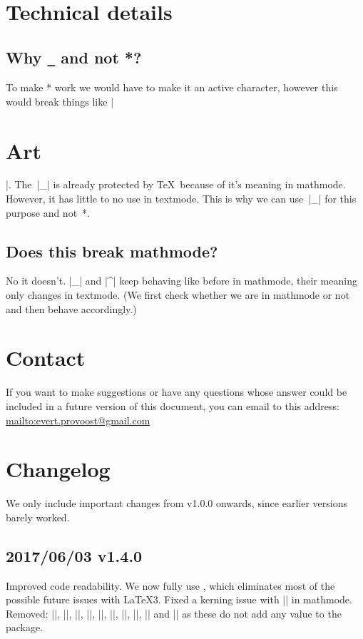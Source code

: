 \documentclass[11pt, cm-default]{l3doc}
\begin{document}

	\section{Technical details}
	\subsection{Why \texttt{\_} and not *?\label{Why?!}}
	To make * work we would have to make it an active character, however this would break things like |\section*{Art}|. The~|_| is already protected by \TeX\ because of it's meaning in mathmode. However, it has little to no use in textmode. This is why we can use~|_| for this purpose and not~*.
	
	\subsection{Does this break mathmode?}
	No it doesn't. |_| and |^| keep behaving like before in mathmode, their meaning only changes in textmode. (We first check whether we are in mathmode or not and then behave accordingly.)

	\section{Contact\label{contact}}
	If you want to make suggestions or have any questions whose answer could be included in a future version of this document, you can email to this address: \url{mailto:evert.provoost@gmail.com}
	\newpage
	
	\section{Changelog}
	We only include important changes from v1.0.0 onwards, since earlier versions barely worked.

	\subsection*{2017/06/03 v1.4.0}
	Improved code readability.
	We now fully use , which eliminates most of the possible future issues with \LaTeX3.
	Fixed a kerning issue with |\cir| in mathmode.
	Removed: |\setundact|, |\setundsub|, |\setciract|, |\setcirsup|, |\nrfamily|, |\nrshape|, |\nrseries|, |\setffamily|, |\setfshape| and |\setfseries| as these do not add any value to the package.
\end{document}
